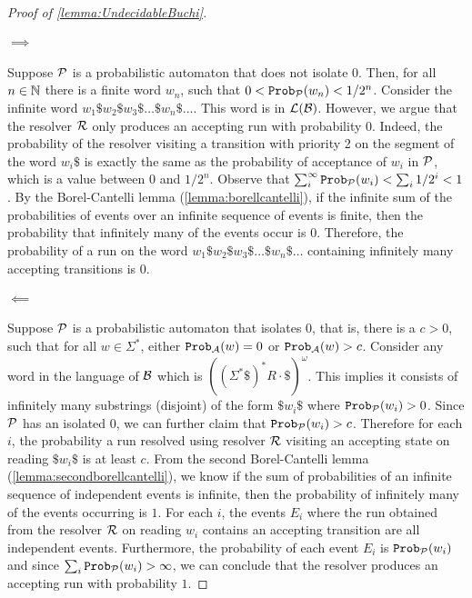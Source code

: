 \begin{proof}[Proof of \cref{lemma:UndecidableBuchi}]
\paragraph*{$\implies$} Suppose $\mathcal{P}$ is a probabilistic automaton that does not isolate $0$. Then, for all  $n\in\mathbb{N}$ there is a finite word $w_n$, such that $0<\mathtt{Prob}_{\mathcal{P}}(w_n)<1/{2^n}$. Consider the infinite word $w_1\$w_2\$w_3\$\dots\$ w_n\$\dots$. This word is in $\mathcal{L}(\mathcal{B})$. However, we argue that the resolver $\mathcal{R}$ only produces an accepting run with probability $0$. Indeed, the probability of the resolver visiting a transition with priority 2 on the segment of the word $w_i\$$ is exactly the same as the probability of acceptance of $w_i$ in $\mathcal{P}$, which is a value between $0$ and $1/2^n$. 
Observe that $\sum_i^\infty \mathtt{Prob}_{\mathcal{P}}(w_i)<\sum_i 1/{2^i} < 1$.
By the Borel-Cantelli lemma (\cref{lemma:borellcantelli}), if the infinite sum of the probabilities of events over an infinite sequence of events is finite, then the probability that infinitely many of the events occur is $0$. Therefore, the probability of a run on the word $w_1\$w_2\$w_3\$\dots\$ w_n\$\dots$ containing infinitely many accepting transitions is $0$.
\paragraph*{$\impliedby$}
Suppose $\mathcal{P}$ is a probabilistic automaton that isolates $0$, that is, there is a $c>0$, such that for all $w\in\Sigma^*$, either $\mathtt{Prob}_{\mathcal{A}}(w) =0 $ or $\mathtt{Prob}_{\mathcal{A}}(w) > c$. 
Consider any word in the language of $\mathcal{B}$ which is  $((\Sigma^*\$)^*R\cdot\$)^\omega$. This implies it consists of infinitely many substrings (disjoint) of the form $\$w_i\$$ where $\mathtt{Prob}_{\mathcal{P}}(w_i) > 0$. Since $\mathcal{P}$ has an isolated $0$, we can further claim that $\mathtt{Prob}_{\mathcal{P}}(w_i) > c$. Therefore for each $i$, the probability a run resolved using resolver $\mathcal{R}$ visiting an accepting state on reading $\$w_i\$$ is at least $c$. From the second Borel-Cantelli lemma (\cref{lemma:secondborellcantelli}), we know if the sum of probabilities of an infinite sequence of independent events is infinite, then the probability of infinitely many of the events occurring is $1$.
For each $i$, the events $E_i$ where the run obtained from the resolver $\mathcal{R}$ on reading $w_i$ contains an accepting transition are all independent events. 
Furthermore, the probability of each event $E_i$ is $\mathtt{Prob}_{\mathcal{P}}(w_i)$ and since $\sum_i \mathtt{Prob}_{\mathcal{P}}(w_i) > \infty$, we can conclude that the resolver produces an accepting run with probability $1$.
\end{proof}


